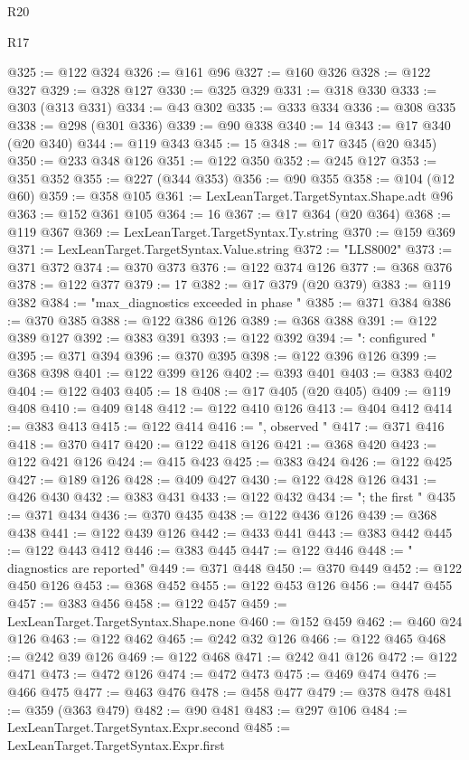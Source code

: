 \begin{lexlean}{R20}
\begin{lexlean}{R17}
\begin{coremodule}
{{{{{{{{{{{{{{{{{{{{{{{{{{{{{{{{{{{{{{{{{{{{{{{{{{{{{{{{{{{{{{{{{{{{{{{{{{{{{{{{{{{{{{{{{{{{{{{{{{{{{{{{{{{@325 := @122 @324
@326 := @161 @96
@327 := @160 @326
@328 := @122 @327
@329 := @328 @127
@330 := @325 @329
@331 := @318 @330
@333 := @303 (@313 @331)
@334 := @43 @302
@335 := @333 @334
@336 := @308 @335
@338 := @298 (@301 @336)
@339 := @90 @338
@340 := 14
@343 := @17 @340 (@20 @340)
@344 := @119 @343
@345 := 15
@348 := @17 @345 (@20 @345)
@350 := @233 @348 @126
@351 := @122 @350
@352 := @245 @127
@353 := @351 @352
@355 := @227 (@344 @353)
@356 := @90 @355
@358 := @104 (@12 @60)
@359 := @358 @105
@361 := LexLeanTarget.TargetSyntax.Shape.adt @96
@363 := @152 @361 @105
@364 := 16
@367 := @17 @364 (@20 @364)
@368 := @119 @367
@369 := LexLeanTarget.TargetSyntax.Ty.string
@370 := @159 @369
@371 := LexLeanTarget.TargetSyntax.Value.string
@372 := "LLS8002"
@373 := @371 @372
@374 := @370 @373
@376 := @122 @374 @126
@377 := @368 @376
@378 := @122 @377
@379 := 17
@382 := @17 @379 (@20 @379)
@383 := @119 @382
@384 := "max_diagnostics exceeded in phase "
@385 := @371 @384
@386 := @370 @385
@388 := @122 @386 @126
@389 := @368 @388
@391 := @122 @389 @127
@392 := @383 @391
@393 := @122 @392
@394 := ": configured "
@395 := @371 @394
@396 := @370 @395
@398 := @122 @396 @126
@399 := @368 @398
@401 := @122 @399 @126
@402 := @393 @401
@403 := @383 @402
@404 := @122 @403
@405 := 18
@408 := @17 @405 (@20 @405)
@409 := @119 @408
@410 := @409 @148
@412 := @122 @410 @126
@413 := @404 @412
@414 := @383 @413
@415 := @122 @414
@416 := ", observed "
@417 := @371 @416
@418 := @370 @417
@420 := @122 @418 @126
@421 := @368 @420
@423 := @122 @421 @126
@424 := @415 @423
@425 := @383 @424
@426 := @122 @425
@427 := @189 @126
@428 := @409 @427
@430 := @122 @428 @126
@431 := @426 @430
@432 := @383 @431
@433 := @122 @432
@434 := "; the first "
@435 := @371 @434
@436 := @370 @435
@438 := @122 @436 @126
@439 := @368 @438
@441 := @122 @439 @126
@442 := @433 @441
@443 := @383 @442
@445 := @122 @443 @412
@446 := @383 @445
@447 := @122 @446
@448 := " diagnostics are reported"
@449 := @371 @448
@450 := @370 @449
@452 := @122 @450 @126
@453 := @368 @452
@455 := @122 @453 @126
@456 := @447 @455
@457 := @383 @456
@458 := @122 @457
@459 := LexLeanTarget.TargetSyntax.Shape.none
@460 := @152 @459
@462 := @460 @24 @126
@463 := @122 @462
@465 := @242 @32 @126
@466 := @122 @465
@468 := @242 @39 @126
@469 := @122 @468
@471 := @242 @41 @126
@472 := @122 @471
@473 := @472 @126
@474 := @472 @473
@475 := @469 @474
@476 := @466 @475
@477 := @463 @476
@478 := @458 @477
@479 := @378 @478
@481 := @359 (@363 @479)
@482 := @90 @481
@483 := @297 @106
@484 := LexLeanTarget.TargetSyntax.Expr.second
@485 := LexLeanTarget.TargetSyntax.Expr.first
}}}}}}}}}}}}}}}}}}}}}}}}}}}}}}}}}}}}}}}}}}}}}}}}}}}}}}}}}}}}}}}}}}}}}}}}}}}}}}}}}}}}}}}}}}}}}}}}}}}}}}}}}}}
\end{coremodule}
\end{lexlean}
\end{lexlean}
